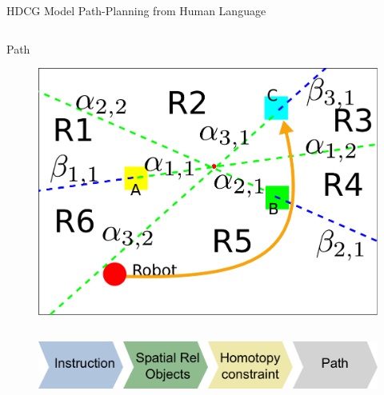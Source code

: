 \begin{frame}{HDCG}{ Model Path-Planning from Human Language }
\begin{columns}
	\begin{block}{Path}
	\begin{figure}
		\centering
		\includegraphics[width=.9\linewidth]{figure/homotopy/example_a_path}
	\end{figure}
	\end{block}
	\end{columns}
	
	\begin{figure}
		\centering
		\includegraphics[width=.9\linewidth]{figure/homotopy_inference}
	\end{figure}

\end{frame}

